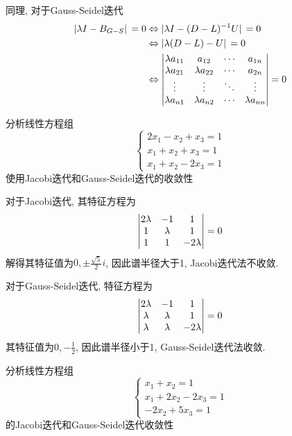 同理, 对于Gauss-Seidel迭代
\begin{align*}
    \abs*{\lambda I-B_{G-S}}=0&\Leftrightarrow\abs*{\lambda I-\inv{(D-L)}U}=0\\
    &\Leftrightarrow\abs*{\lambda(D-L)-U}=0\\
    &\Leftrightarrow\mqty|
    \lambda a_{11}&a_{12}&\cdots&a_{1n}\\
    \lambda a_{21}&\lambda a_{22}&\cdots&a_{2n}\\
    \vdots&\vdots&\ddots&\vdots\\
    \lambda a_{n1}&\lambda a_{n2}&\cdots&\lambda a_{nn}
    |=0
\end{align*}

\begin{example}
    分析线性方程组
    \begin{equation*}
        \begin{cases}
            2x_1-x_2+x_3=1\\
            x_1+x_2+x_3=1\\
            x_1+x_2-2x_3=1
        \end{cases}
    \end{equation*}
    使用Jacobi迭代和Gauss-Seidel迭代的收敛性
\end{example}

\begin{solution}
    对于Jacobi迭代, 其特征方程为
    \begin{equation*}
        \mqty|
        2\lambda&-1&1\\
        1&\lambda&1\\
        1&1&-2\lambda|=0
    \end{equation*}
    解得其特征值为$0,\pm\frac{\sqrt{5}}{2}i$, 因此谱半径大于1, Jacobi迭代法不收敛.

    对于Gauss-Seidel迭代, 特征方程为
    \begin{equation*}
        \mqty|
        2\lambda&-1&1\\
        \lambda&\lambda&1\\
        \lambda&\lambda&-2\lambda|=0
    \end{equation*}
    其特征值为$0,-\frac{1}{2}$, 因此谱半径小于1, Gauss-Seidel迭代法收敛.
\end{solution}

\begin{example}
    分析线性方程组
    \begin{equation*}
        \begin{cases}
            x_1+x_2=1\\
            x_1+2x_2-2x_3=1\\
            -2x_2+5x_3=1
        \end{cases}
    \end{equation*}
    的Jacobi迭代和Gauss-Seidel迭代收敛性
\end{example}

